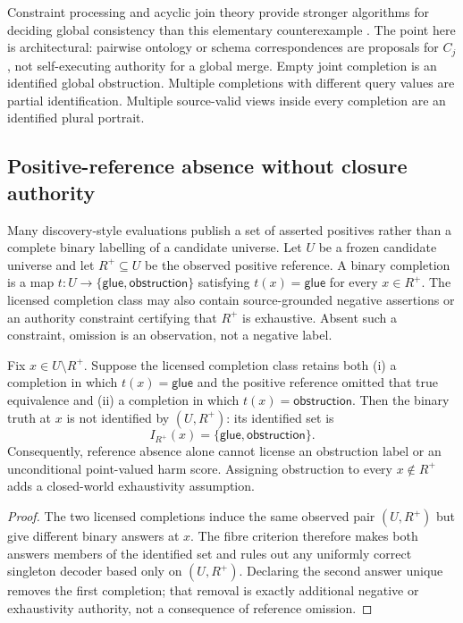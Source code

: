 Constraint processing and acyclic join theory provide stronger algorithms for
deciding global consistency than this elementary counterexample
\cite{dechter2003constraint}. The point here is architectural: pairwise
ontology or schema correspondences are proposals for $C_j$, not self-executing
authority for a global merge. Empty joint completion is an identified global
obstruction. Multiple completions with different query values are partial
identification. Multiple source-valid views inside every completion are an
identified plural portrait.

\subsection{Positive-reference absence without closure authority}

Many discovery-style evaluations publish a set of asserted positives rather
than a complete binary labelling of a candidate universe. Let $U$ be a frozen
candidate universe and let $R^+\subseteq U$ be the observed positive reference.
A binary completion is a map
$t:U\rightarrow\{\mathsf{glue},\mathsf{obstruction}\}$ satisfying
$t(x)=\mathsf{glue}$ for every $x\in R^+$. The licensed completion class may
also contain source-grounded negative assertions or an authority constraint
certifying that $R^+$ is exhaustive. Absent such a constraint, omission is an
observation, not a negative label.

\begin{theorem}
\label{thm:positive-reference-nonidentification}
Fix $x\in U\setminus R^+$. Suppose the licensed completion class retains both
(i) a completion in which $t(x)=\mathsf{glue}$ and the positive reference
omitted that true equivalence and (ii) a completion in which
$t(x)=\mathsf{obstruction}$. Then the binary truth at $x$ is not identified by
$(U,R^+)$: its identified set is
\begin{equation}
  I_{R^+}(x)=\{\mathsf{glue},\mathsf{obstruction}\}.
\end{equation}
Consequently, reference absence alone cannot license an obstruction label or
an unconditional point-valued harm score. Assigning obstruction to every
$x\notin R^+$ adds a closed-world exhaustivity assumption.
\end{theorem}

\begin{proof}
The two licensed completions induce the same observed pair $(U,R^+)$ but give
different binary answers at $x$. The fibre criterion therefore makes both
answers members of the identified set and rules out any uniformly correct
singleton decoder based only on $(U,R^+)$. Declaring the second answer unique
removes the first completion; that removal is exactly additional negative or
exhaustivity authority, not a consequence of reference omission.
\end{proof}

